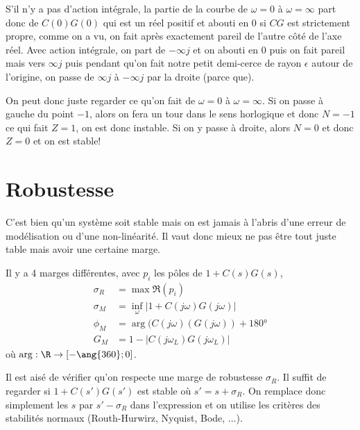 S'il n'y a pas d'action intégrale, la partie de la courbe de $\omega = 0$ à $\omega = \infty$
part donc de $C(0)G(0)$ qui est un réel positif
et abouti en $0$ si $CG$ est strictement propre, comme on a vu, on fait après exactement pareil
de l'autre côté de l'axe réel.
Avec action intégrale, on part de $-\infty j$ et on abouti en $0$ puis on fait pareil
mais vers $\infty j$ puis pendant qu'on fait notre petit demi-cerce de rayon $\epsilon$ autour
de l'origine, on passe de $\infty j$ à $-\infty j$ par la droite (parce que).

On peut donc juste regarder ce qu'on fait de $\omega = 0$ à $\omega = \infty$.
Si on passe à gauche du point $-1$,
alors on fera un tour dans le sens horlogique et donc
$N = -1$ ce qui fait $Z = 1$, on est donc instable.
Si on y passe à droite, alors $N = 0$ et donc $Z = 0$ et on est stable!

\section{Robustesse}
C'est bien qu'un système soit stable mais on est jamais à l'abris d'une erreur de
modélisation ou d'une non-linéarité.
Il vaut donc mieux ne pas être tout juste table mais avoir une certaine marge.

Il y a 4 marges différentes, avec $p_i$ les pôles de $1 + C(s)G(s)$,
\begin{align*}
  \sigma_R & = \max \Re(p_i)\\
  \sigma_M & = \inf_\omega|1 + C(j\omega)G(j\omega)|\\
  \phi_M & = \arg(C(j\omega)(G(j\omega)) + \ang{180}\\
  G_M & = 1 - |C(j\omega_L)G(j\omega_L)|
\end{align*}
où $\arg:\R\to[-\ang{360};0]$.

Il est aisé de vérifier qu'on respecte une marge de robustesse $\sigma_R$.
Il suffit de regarder si $1 + C(s')G(s')$ est stable où $s' = s + \sigma_R$.
On remplace donc simplement les $s$ par $s' - \sigma_R$ dans l'expression
et on utilise les critères des stabilités normaux
(Routh-Hurwirz, Nyquist, Bode, ...).

